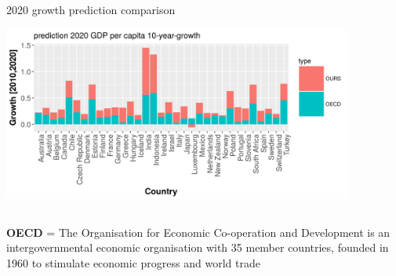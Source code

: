\documentclass[9pt]{beamer}
\begin{document}
\begin{frame}{2020 growth prediction comparison}
	\includegraphics[height=6.5cm,width=11.5cm]{OECD.png}
	
	
	\textbf{OECD} = The Organisation for Economic Co-operation and Development  is an intergovernmental economic organisation with 35 member countries, founded in 1960 to stimulate economic progress and world trade
\end{frame}
\end{document}
